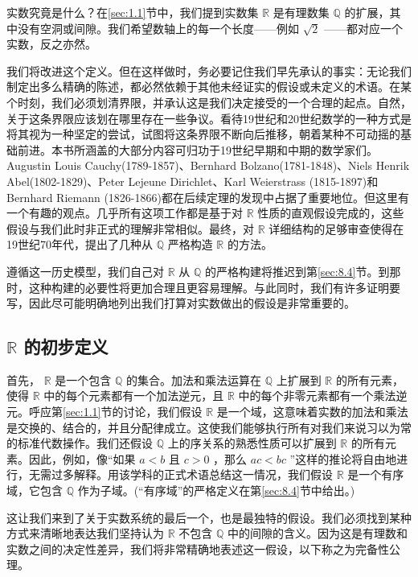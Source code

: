 实数究竟是什么？在\ref{sec:1.1}节中，我们提到实数集 \(\mathbb{R}\) 是有理数集 \(\mathbb{Q}\) 的扩展，其中没有空洞或间隙。我们希望数轴上的每一个长度——例如 \(\sqrt{2}\) ——都对应一个实数，反之亦然。

我们将改进这个定义。但在这样做时，务必要记住我们早先承认的事实：无论我们制定出多么精确的陈述，都必然依赖于其他未经证实的假设或未定义的术语。在某个时刻，我们必须划清界限，并承认这是我们决定接受的一个合理的起点。自然，关于这条界限应该划在哪里存在一些争议。看待19世纪和20世纪数学的一种方式是将其视为一种坚定的尝试，试图将这条界限不断向后推移，朝着某种不可动摇的基础前进。本书所涵盖的大部分内容可归功于19世纪早期和中期的数学家们。Augustin Louis Cauchy(1789-1857)、Bernhard Bolzano(1781-1848)、Niels Henrik Abel(1802-1829)、Peter Lejeune Dirichlet、Karl Weierstrass (1815-1897)和 Bernhard Riemann (1826-1866)都在后续定理的发现中占据了重要地位。但这里有一个有趣的观点。几乎所有这项工作都是基于对 \(\mathbb{R}\) 性质的直观假设完成的，这些假设与我们此时非正式的理解非常相似。最终，对 \(\mathbb{R}\) 详细结构的足够审查使得在19世纪70年代，提出了几种从 \(\mathbb{Q}\) 严格构造 \(\mathbb{R}\) 的方法。

遵循这一历史模型，我们自己对 \(\mathbb{R}\) 从 \(\mathbb{Q}\) 的严格构建将推迟到第\ref{sec:8.4}节。到那时，这种构建的必要性将更加合理且更容易理解。与此同时，我们有许多证明要写，因此尽可能明确地列出我们打算对实数做出的假设是非常重要的。

\subsection{\(\mathbb{R}\) 的初步定义}

首先， \(\mathbb{R}\) 是一个包含 \(\mathbb{Q}\) 的集合。加法和乘法运算在 \(\mathbb{Q}\) 上扩展到 \(\mathbb{R}\) 的所有元素，使得 \(\mathbb{R}\) 中的每个元素都有一个加法逆元，且 \(\mathbb{R}\) 中的每个非零元素都有一个乘法逆元。呼应第\ref{sec:1.1}节的讨论，我们假设 \(\mathbb{R}\) 是一个域，这意味着实数的加法和乘法是交换的、结合的，并且分配律成立。这使我们能够执行所有对我们来说习以为常的标准代数操作。我们还假设 \(\mathbb{Q}\) 上的序关系的熟悉性质可以扩展到 \(\mathbb{R}\) 的所有元素。因此，例如，像“如果 \(a < b\) 且 \(c > 0\) ，那么 \({ac} < {bc}\) ”这样的推论将自由地进行，无需过多解释。用该学科的正式术语总结这一情况，我们假设 \(\mathbb{R}\) 是一个有序域，它包含 \(\mathbb{Q}\) 作为子域。(“有序域”的严格定义在第\ref{sec:8.4}节中给出。)

这让我们来到了关于实数系统的最后一个，也是最独特的假设。我们必须找到某种方式来清晰地表达我们坚持认为 \(\mathbb{R}\) 不包含 \(\mathbb{Q}\) 中的间隙的含义。因为这是有理数和实数之间的决定性差异，我们将非常精确地表述这一假设，以下称之为完备性公理。

